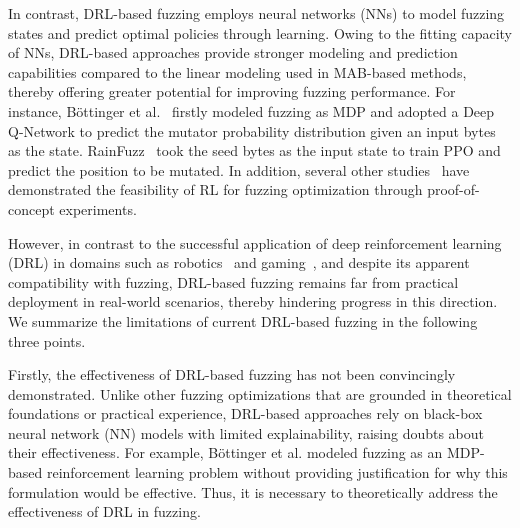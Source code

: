 \documentclass[lettersize,journal]{IEEEtran}
\begin{document}
In contrast, DRL-based fuzzing employs neural networks (NNs) to model fuzzing states and predict optimal policies through learning. Owing to the fitting capacity of NNs, DRL-based approaches provide stronger modeling and prediction capabilities compared to the linear modeling used in MAB-based methods, thereby offering greater potential for improving fuzzing performance. For instance, Böttinger et al.~\cite{bottingerDeepReinforcementFuzzing2018} firstly modeled fuzzing as MDP and adopted a Deep Q-Network to predict the mutator probability distribution given an input bytes as the state. RainFuzz~\cite{binosiRainfuzzReinforcementlearningDriven2023} took the seed bytes as the input state to train PPO and predict the position to be mutated. In addition, several other studies~\cite{gongDRLFCfuzzerFuzzingDeepReinforcementLearning2022,jeonDrPathFinderHybrid2022,liangRLFDirectedFuzzing2022,liuXRLFuzzFuzzingBinaries2024} have demonstrated the feasibility of RL for fuzzing optimization through proof-of-concept experiments.

However, in contrast to the successful application of deep reinforcement learning (DRL) in domains such as robotics~\cite{zhaoSurveyRecentAdvancements2024,tangDeepReinforcementLearning2025} and gaming~\cite{silverMasteringChessShogi2017}, and despite its apparent compatibility with fuzzing, DRL-based fuzzing remains far from practical deployment in real-world scenarios, thereby hindering progress in this direction. We summarize the limitations of current DRL-based fuzzing in the following three points.

Firstly, the effectiveness of DRL-based fuzzing has not been convincingly demonstrated. Unlike other fuzzing optimizations that are grounded in theoretical foundations or practical experience, DRL-based approaches rely on black-box neural network (NN) models with limited explainability, raising doubts about their effectiveness. For example, Böttinger et al. modeled fuzzing as an MDP-based reinforcement learning problem without providing justification for why this formulation would be effective. Thus, it is necessary to theoretically address the effectiveness of DRL in fuzzing.
\end{document}
